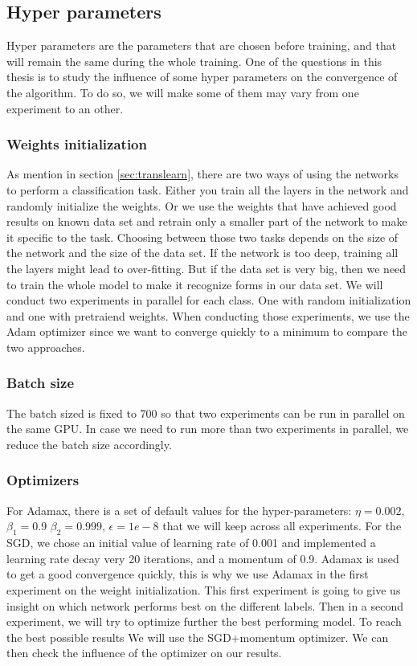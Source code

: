 \subsection{Hyper parameters}
Hyper parameters are the parameters that are chosen before training, and that will remain the same during the whole training. One of the questions in this thesis is to study the influence of some hyper parameters on the  convergence of the algorithm. To do so, we will make some of them may vary from one experiment to an other. 

\subsubsection{Weights initialization}
As mention in section \ref{sec:translearn}, there are two ways of using the networks to perform a classification task. Either you train all the layers in the network and randomly initialize the weights. Or we use the weights that have achieved good results on known data set and retrain only a smaller part of the network to make it specific to the task.
Choosing between those two tasks depends on the size of the network and the size of the data set. If the network is too deep, training all the layers might lead to over-fitting. But if the data set is very big, then we need to train the whole model to make it recognize forms in our data set. 
We will conduct two experiments in parallel for each class. One with random initialization and one with pretraiend weights. 
When conducting those experiments, we use the Adam optimizer since we want to converge quickly to a minimum to compare the two approaches. 

\subsubsection{Batch size}
The batch sized is fixed to 700 so that two experiments can be run in parallel on the same GPU. In case we need to run more than two experiments in parallel, we reduce the batch size accordingly.

\subsubsection{Optimizers}
For Adamax, there is a set of default values for the hyper-parameters: \(\eta = 0.002\), \(\beta_1 = 0.9\) \(\beta_2 = 0.999\), \(\epsilon = 1e-8\) that we will keep across all experiments.
For the SGD, we chose an initial value of learning rate of 0.001 and implemented a learning rate decay very 20 iterations, and a momentum of 0.9. 
Adamax is used to get a good convergence quickly, this is why we use Adamax in the first experiment on the weight initialization. This first experiment is going to give us insight on which network performs best on the different labels. Then in a second experiment, we will try to optimize further the best performing model. To reach the best possible results We will use the SGD+momentum optimizer.  We can then check the influence of the optimizer on our results.

